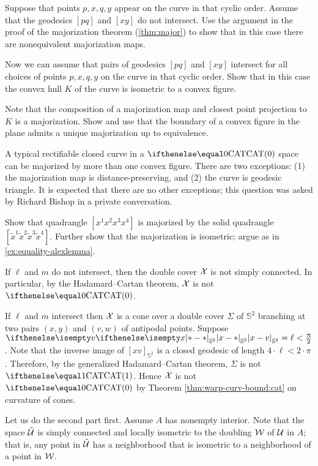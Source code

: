 Suppose that points $p,x,q,y$ appear on the curve in that cyclic order.
Assume that the geodesics $[pq]$ and $[xy]$ do not intersect.
Use the argument in the proof of the majorization theorem (\ref{thm:major}) to show that in this case there are nonequivalent majorization maps.

Now we can assume that pairs of geodesics $[pq]$ and $[xy]$ intersect for all choices of points $p,x,q,y$ on the curve in that cyclic order.
Show that in this case the convex hull $K$ of the curve is isometric to a convex figure.

Note that the composition of a majorization map and closest point projection to $K$ is a majorization.
Show and use that the boundary of a convex figure in the plane admits a unique majorization up to equivalence.

A typical rectifiable closed curve in a $\CAT0$ space can be majorized by more than one convex figure.
There are two exceptions: (1) the majorization map is distance-preserving, and (2) the curve is geodesic triangle.
It is expected that there are no other exceptions;
this question was asked by Richard Bishop in a private conversation.

Show that quadrangle $[x^1x^2x^3x^4]$ is majorized by the solid quadrangle $[\tilde x^1\tilde x^2\tilde x^3\tilde x^4]$.
Further show that the majorization is isometric;
argue as in \ref{ex:equality-alexlemma}.

If $\ell$ and $m$ do not intersect, then the double cover $\mathcal{X}$ is not simply connected.
In particular, by the Hadamard--Cartan theorem, $\mathcal{X}$ is not $\CAT0$.

If $\ell$ and $m$ intersect then $\mathcal{X}$ is a cone over a double cover $\Sigma$ of $\mathbb{S}^2$ branching at two pairs $(x,y)$ and $(v,w)$ of antipodal points.
Suppose $\dist{x}{v}{\mathbb{S}^2}=\ell<\tfrac\pi2$.
Note that the inverse image of $[xv]_{\mathbb{S}^2}$ is a closed geodesic of length $4\cdot\ell<2\cdot\pi$.
Therefore, by the generalized Hadamard--Cartan theorem, $\Sigma$ is not $\CAT1$. Hence $\mathcal{X}$ is not $\CAT0$ by Theorem \ref{thm:warp-curv-bound:cat}  on curvature of cones.

Let us do the second part first.
Assume $A$ has nonempty interior. 
Note that the space $\tilde{\mathcal{U}}$ is simply connected and locally isometric to the doubling $\mathcal{W}$ of $\mathcal{U}$ in $A$;
that is, any point in $\tilde{\mathcal{U}}$ has a neighborhood 
that is isometric to a neighborhood of a point in $\mathcal{W}$.

